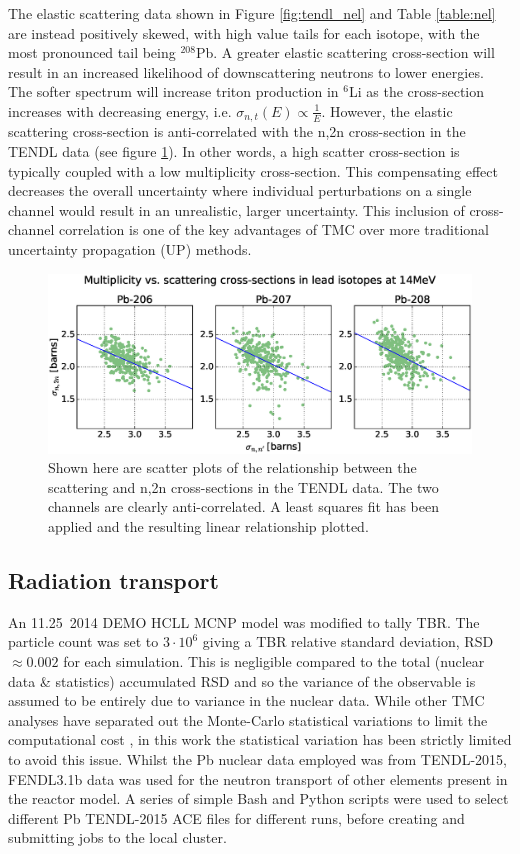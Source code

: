 The elastic scattering data shown in Figure \ref{fig:tendl_nel} and Table \ref{table:nel} are instead positively skewed, with high value tails for each isotope, with the most pronounced tail being $^{208}$Pb. A greater elastic scattering cross-section will result in an increased likelihood of downscattering neutrons to lower energies. The softer spectrum will increase triton production in $^{6}$Li as the cross-section increases with decreasing energy, i.e. $\sigma_{n,t}(E) \propto \frac{1}{E}$. However, the elastic scattering cross-section is anti-correlated with the n,2n cross-section in the TENDL data (see figure \ref{fig:pb_el_n2n_corr}). In other words, a high scatter cross-section is typically coupled with a low multiplicity cross-section. This compensating effect decreases the overall uncertainty where individual perturbations on a single channel would result in an unrealistic, larger uncertainty. This inclusion of cross-channel correlation is one of the key advantages of TMC over more traditional uncertainty propagation (UP) methods. 

\begin{figure}[ht]
	\includegraphics[width=\textwidth]{pb_el_n2n_corr}
  \caption{Shown here are scatter plots of the relationship between the scattering and n,2n cross-sections in the TENDL data. The two channels are clearly anti-correlated. A least squares fit has been applied and the resulting linear relationship plotted.}
	\label{fig:pb_el_n2n_corr}
\end{figure}

\subsection{Radiation transport}
An 11.25\degree \ 2014 DEMO HCLL MCNP model was modified to tally TBR. The particle count was set to $3\cdot10^{6}$ giving a TBR relative standard deviation, RSD $\approx 0.002$ for each simulation. This is negligible compared to the total (nuclear data \& statistics) accumulated RSD and so the variance of the observable is assumed to be entirely due to variance in the nuclear data. While other TMC analyses have separated out the Monte-Carlo statistical variations to limit the computational cost \cite{Rochman2014a}, in this work the statistical variation has been strictly limited to avoid this issue. Whilst the Pb nuclear data employed was from TENDL-2015, FENDL3.1b data was used for the neutron transport of other elements present in the reactor model. A series of simple Bash and Python scripts were used to select different Pb TENDL-2015 ACE files for different runs, before creating and submitting jobs to the local cluster.


